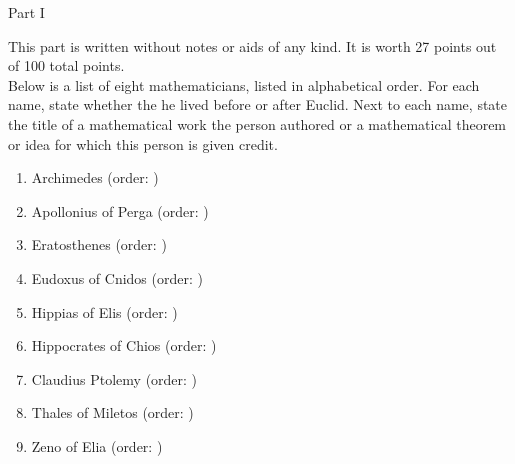\documentclass[11pt]{article}
\def\bc{\begin{center}}
\def\ec{\end{center}}
\def\be{\begin{enumerate}}
\def\ee{\end{enumerate}}
\begin{document}
\vspace*{-0.3in}

\bc Part I \ec

This part is written without notes or aids of any kind. It is worth 27 points out of 100 total points. \\

Below is a list of eight mathematicians, listed in alphabetical order. For each name, state whether the he lived before or after Euclid. Next to each name, state the title of a mathematical work the person authored or a mathematical theorem or idea for which this person is given credit.\\



\be
\item Archimedes (order: \underline{\hspace{1in}})
\vfill

\item Apollonius of Perga (order: \underline{\hspace{1in}})
\vfill

\item Eratosthenes (order: \underline{\hspace{1in}})
\vfill
\item Eudoxus of Cnidos (order: \underline{\hspace{1in}})

\vfill


\item Hippias of Elis (order: \underline{\hspace{1in}})

\vfill
\item Hippocrates of Chios (order: \underline{\hspace{1in}})

\vfill
\item Claudius Ptolemy (order: \underline{\hspace{1in}})

\vfill
\item Thales of Miletos (order: \underline{\hspace{1in}})

\vfill
\item Zeno of Elia (order: \underline{\hspace{1in}})

\vfill
\ee
\end{document}

